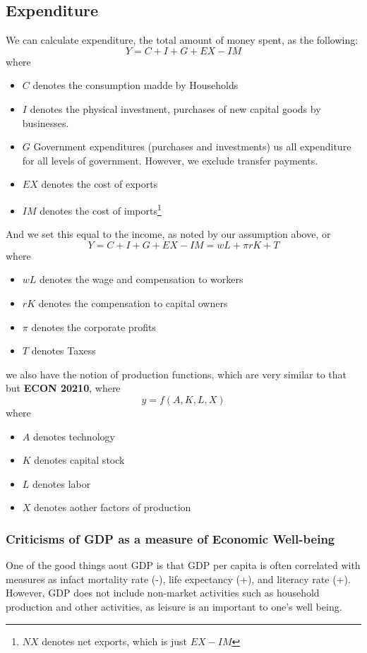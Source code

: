 \documentclass[11pt]{article}
\begin{document}
\subsection{Expenditure}
We can calculate expenditure, the total amount of money spent, as the following:
\[
Y = C + I + G + EX - IM 
\]
where 
\begin{itemize}
    \item $C$ denotes the consumption madde by Households
    \item $I$ denotes the physical investment, purchases of new capital goods by businesses. 
    \item $G$ Government expenditures (purchases and investments) us all expenditure for all levels of government. However, we exclude transfer payments. 
    \item $EX$ denotes the cost of exports
    \item $IM$ denotes the cost of imports\footnote{$NX$ denotes net exports, which is just $EX - IM$}
\end{itemize}
And we set this equal to the income, as noted by our assumption above, or 
\[
Y = C + I + G + EX - IM = wL + \pi rK + T
\]
where 
\begin{itemize}
    \item $wL$ denotes the wage and compensation to workers
    \item $rK$ denotes the compensation to capital owners
    \item $\pi$ denotes the corporate profits
    \item $T$ denotes Taxess
\end{itemize}
we also have the notion of production functions, which are very similar to that but \textbf{ECON 20210}, where 
\[
y = f(A,K, L, X)
\]
where
\begin{itemize}
    \item $A$ denotes technology 
    \item $K$ denotes capital stock 
    \item $L$ denotes labor
    \item $X$ denotes aother factors of production
\end{itemize}
\subsubsection{Criticisms of GDP as a measure of Economic Well-being}
One of the good things aout GDP is that GDP per capita is often correlated with measures as infact mortality rate (-), life expectancy (+), and literacy rate (+). However, GDP does not include non-market activities such as household production and other activities, as leisure is an important to one's well being.  
\end{document}
